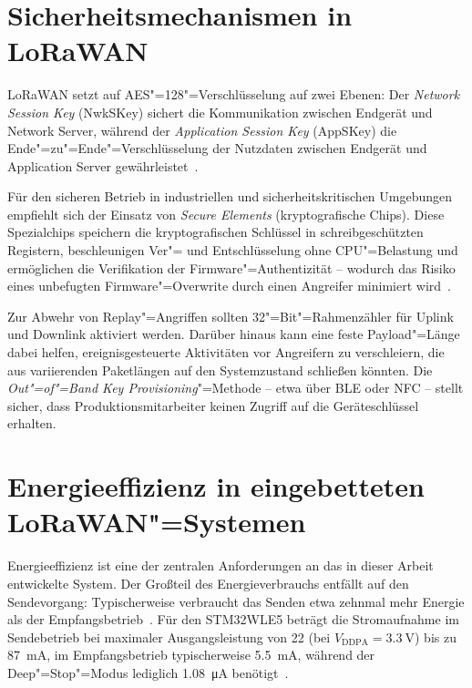 \section{Sicherheitsmechanismen in LoRaWAN}
\label{sec:sicherheit}

LoRaWAN setzt auf AES"=128"=Verschlüsselung auf zwei Ebenen: Der \textit{Network
Session Key} (NwkSKey) sichert die Kommunikation zwischen Endgerät und Network
Server, während der \textit{Application Session Key} (AppSKey) die Ende"=zu"=Ende"=Verschlüsselung
der Nutzdaten zwischen Endgerät und Application Server gewährleistet~\cite{lorawan_spec}.

Für den sicheren Betrieb in industriellen und sicherheitskritischen Umgebungen empfiehlt
sich der Einsatz von \textit{Secure Elements} (kryptografische Chips). Diese
Spezialchips speichern die kryptografischen Schlüssel in schreibgeschützten Registern,
beschleunigen Ver"= und Entschlüsselung ohne CPU"=Belastung und ermöglichen die
Verifikation der Firmware"=Authentizität -- wodurch das Risiko eines unbefugten
Firmware"=Overwrite durch einen Angreifer minimiert wird~\cite{semtech_lora_basics}.

Zur Abwehr von Replay"=Angriffen sollten 32"=Bit"=Rahmenzähler für Uplink und Downlink
aktiviert werden. Darüber hinaus kann eine feste Payload"=Länge dabei helfen, ereignisgesteuerte
Aktivitäten vor Angreifern zu verschleiern, die aus variierenden Paketlängen auf den
Systemzustand schließen könnten. Die \textit{Out"=of"=Band Key Provisioning}"=Methode
-- etwa über BLE oder NFC -- stellt sicher, dass Produktionsmitarbeiter keinen Zugriff
auf die Geräteschlüssel erhalten.


\section{Energieeffizienz in eingebetteten LoRaWAN"=Systemen}
\label{sec:energieeffizienz}

Energieeffizienz ist eine der zentralen Anforderungen an das in dieser Arbeit
entwickelte System. Der Großteil des Energieverbrauchs entfällt auf den Sendevorgang:
Typischerweise verbraucht das Senden etwa zehnmal mehr Energie als der
Empfangsbetrieb~\cite{semtech_lora_basics}. Für den STM32WLE5 beträgt die Stromaufnahme
im Sendebetrieb bei maximaler Ausgangsleistung von \SI{22}{\dBm} (bei $V_\text{DDPA} =
\SI{3.3}{\V}$) bis zu \SI{87}{\mA}, im Empfangsbetrieb typischerweise \SI{5.5}{\mA},
während der Deep"=Stop"=Modus lediglich \SI{1.08}{\uA} benötigt~\cite{stm32wl_ds}.

